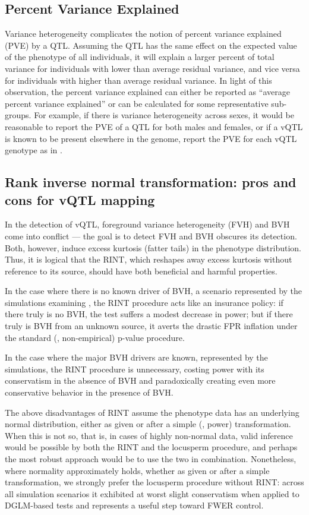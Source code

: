 \subsection{Percent Variance Explained}
Variance heterogeneity complicates the notion of percent variance explained (PVE) by a QTL.
Assuming the QTL has the same effect on the expected value of the phenotype of all individuals, it will explain a larger percent of total variance for individuals with lower than average residual variance, and vice versa for individuals with higher than average residual variance.
In light of this observation, the percent variance explained can either be reported as ``average percent variance explained'' or can be calculated for some representative sub-groups.
For example, if there is variance heterogeneity across sexes, it would be reasonable to report the PVE of a QTL for both males and females, or if a vQTL is known to be present elsewhere in the genome, report the PVE for each vQTL genotype as in \cite{Yang2012}.


\subsection{Rank inverse normal transformation: pros and cons for vQTL mapping}
In the detection of vQTL, foreground variance heterogeneity (FVH) and BVH come into conflict --- the goal is to detect FVH and BVH obscures its detection.
Both, however, induce excess kurtosis (fatter tails) in the phenotype distribution.
Thus, it is logical that the RINT, which reshapes away excess kurtosis without reference to its source, should have both beneficial and harmful properties.

In the case where there is no known driver of BVH, a scenario represented by the simulations examining \Caov, the RINT procedure acts like an insurance policy: if there truly is no BVH, the test suffers a modest decrease in power; but if there truly is BVH from an unknown source, it averts the drastic FPR inflation under the standard (\ie, non-empirical) p-value procedure.

In the case where the major BVH drivers are known, represented by the \DGLMv simulations, the RINT procedure is unnecessary, costing power with its conservatism in the absence of BVH and paradoxically creating even more conservative behavior in the presence of BVH.

The above disadvantages of RINT assume the phenotype data has an underlying normal distribution, either as given or after a simple (\eg, power) transformation.
When this is not so, that is, in cases of highly non-normal data, valid inference would be possible by both the RINT and the locusperm procedure, and perhaps the most robust approach would be to use the two in combination. 
Nonetheless, where normality approximately holds, whether as given or after a simple transformation, we strongly prefer the locusperm procedure without RINT: across all simulation scenarios it exhibited at worst slight conservatism when applied to DGLM-based tests and represents a useful step toward FWER control.




